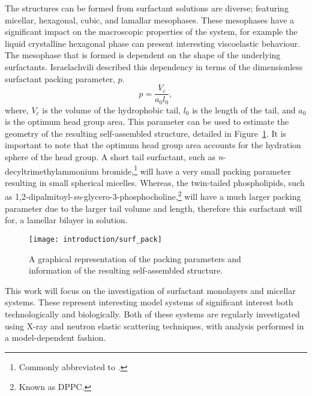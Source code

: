 The structures can be formed from surfactant solutions are diverse; featuring micellar, hexagonal, cubic, and lamallar mesophases.
These mesophases have a significant impact on the macroscopic properties of the system, for example the liquid crystalline hexagonal phase can present interesting viscoelastic behaviour.\autocite{jurasin_lamellar_2013,cordobes_linear_1997}
The mesophase that is formed is dependent on the shape of the underlying surfactants.
Israelachvili described this dependency in terms of the dimensionless surfactant packing parameter, $p$.\autocite{israelachvili_intermolecular_2011}
%
\begin{equation}
p = \frac{V_c}{a_0l_0},
\end{equation}
%
where, $V_c$ is the volume of the hydrophobic tail, $l_0$ is the length of the tail, and $a_0$ is the optimum head group area.
This parameter can be used to estimate the geometry of the resulting self-assembled structure, detailed in Figure~\ref{fig:pack}.
It is important to note that the optimum head group area accounts for the hydration sphere of the head group.
A short tail surfactant, such as \emph{n}-decyltrimethylammonium bromide,\footnote{Commonly abbreviated to .} will have a very small packing parameter resulting in small spherical micelles.
Whereas, the twin-tailed phospholipids, such as 1,2-dipalmitoyl-\emph{sn}-glycero-3-phosphocholine,\footnote{Known as DPPC.} will have a much larger packing parameter due to the larger tail volume and length, therefore this surfactant will for, a lamellar bilayer in solution.
%
\begin{figure}
    \centering
    \texttt{[image: introduction/surf\_pack]}
    \caption{A graphical representation of the packing parameters and information of the resulting self-assembled structure.}
    \label{fig:pack}
\end{figure}
%

This work will focus on the investigation of surfactant monolayers and micellar systems.
These represent interesting model systems of significant interest both technologically\autocite{anton_reverse_2010,zagnoni_miniaturised_2012} and biologically.\autocite{kataoka_block_2012,mohwald_phospholipid_1990,kewalramani_effects_2010}
Both of these systems are regularly investigated using X-ray and neutron elastic scattering techniques, with analysis performed in a model-dependent fashion.\autocite{pambou_structural_2015,hayward_liquid_2015,rodriguez-loureiro_neutron_2017,hazell_langmuir_2016}
